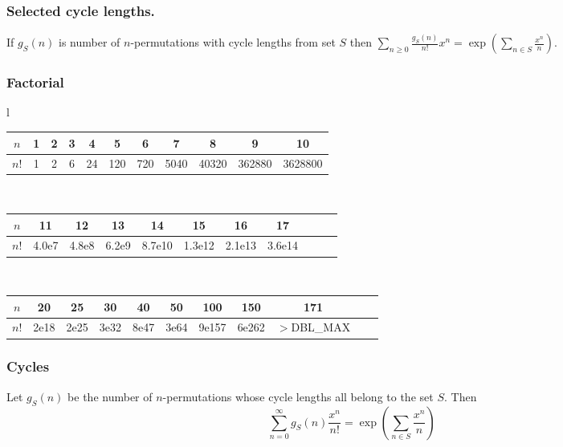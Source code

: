 \begin{small}
  \subsubsection{Selected cycle lengths.} If $g_S(n)$ is number of $n$-permutations with cycle lengths from set $S$ then $\sum_{n\geq 0} \frac{g_S(n)}{n!}x^n=\exp(\sum_{n\in S}\frac{x^n}{n})$.

  \subsubsection{Factorial}
    \begin{center}
    \begin{tabular}{l}
    \begin{tabular}{c|c@{\ }c@{\ }c@{\ }c@{\ }c@{\ }c@{\ }c@{\ }c@{\ }c@{\ }c}
    $n$  & 1 & 2 & 3 & 4  & 5   & 6   & 7    & 8     & 9      & 10\\
    \hline
    $n!$ & 1 & 2 & 6 & 24 & 120 & 720 & 5040 & 40320 & 362880 & 3628800\\
    \end{tabular}\\
    \begin{tabular}{c|c@{\ }c@{\ }c@{\ }c@{\ }c@{\ }c@{\ }c@{\ }c@{\ }c@{\ }c}
    $n$  & 11    & 12    & 13    & 14     & 15     & 16     & 17\\
    \hline
    $n!$ & 4.0e7 & 4.8e8 & 6.2e9 & 8.7e10 & 1.3e12 & 2.1e13 & 3.6e14\\
    \end{tabular}\\
    \begin{tabular}{c|c@{\ }c@{\ }c@{\ }c@{\ }c@{\ }c@{\ }c@{\ }c@{\ }c@{\ }c}
    $n$  & 20   & 25   & 30   & 40   & 50   & 100   & 150   & 171\\
    \hline
    $n!$ & 2e18 & 2e25 & 3e32 & 8e47 & 3e64 & 9e157 & 6e262 & \scriptsize{$>$DBL\_MAX}\\
    \end{tabular}
    \end{tabular}
    \end{center}


  \subsubsection{Cycles}
    Let $g_S(n)$ be the number of $n$-permutations whose cycle lengths all belong to the set $S$. Then
    $$\sum_{n=0} ^\infty g_S(n) \frac{x^n}{n!} = \exp\left(\sum_{n\in S} \frac{x^n} {n} \right)$$


\end{small}
